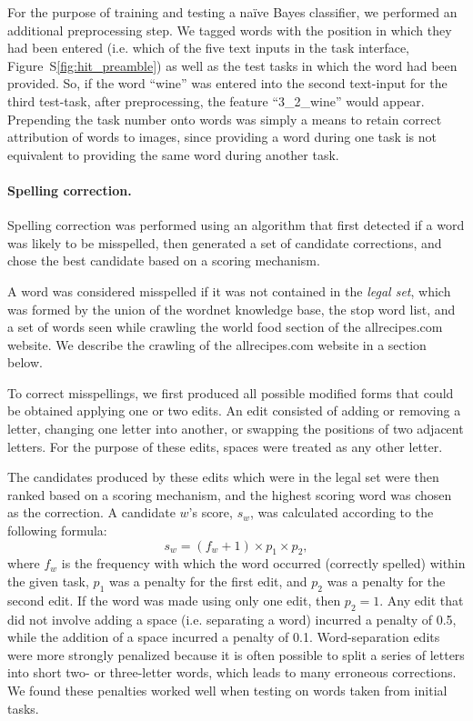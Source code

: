 \documentclass{sigchi}
\begin{document}
	For the purpose of training and testing a na\"ive Bayes classifier, we 
	performed an additional preprocessing step.  We tagged words with the
	position in which they had been entered (i.e. which of the five text 
	inputs in the task interface, Figure~S\ref{fig:hit_preamble}) 
	as well as the test tasks in which the word had been provided.
	So, if the word ``wine'' was entered into the second text-input for 
	the third test-task, after preprocessing, the feature ``3\_2\_wine'' would
	appear.  Prepending the task number onto words was simply a means to 
	retain correct attribution of words to images, since providing a word 
	during one task 
	is not equivalent to providing the same word during another task.  
	
	\paragraph{Spelling correction.}  
	Spelling correction was performed using an algorithm that first detected
	if a word was likely to be misspelled, then generated a set of candidate 
	corrections, and chose the best candidate based on a scoring mechanism.
	
	A word was considered misspelled if it was not contained in the 
	\textit{legal set}, which was formed by the union of
	the wordnet knowledge base, the stop word list, and a set of words 
	seen while 
	crawling the world food section of the allrecipes.com website.  We
	describe the crawling of the allrecipes.com website in a section below.

	To correct misspellings, we first produced all possible modified forms 
	that could be obtained applying one or two edits.  An edit consisted of 
	adding or removing a letter, changing one letter into another, or 
	swapping the positions of two adjacent letters.  For the purpose of these 
	edits, spaces were treated as any other letter.

	The candidates produced by these edits which were in the legal set were
	then ranked based on a scoring mechanism, and the highest scoring word
	was chosen as the correction.  A candidate $w$'s score, $s_w$, was 
	calculated according to the following formula:
	\begin{equation}
		s_w = (f_w + 1) \times p_1 \times p_2,
	\end{equation}
	where $f_w$ is the frequency with which the word occurred (correctly 
	spelled)
	within the given task, $p_1$ was a penalty for the first edit, and
	$p_2$ was a penalty for the second edit.  If the word was made using only
	one edit, then $p_2 = 1$.  Any edit that did not involve adding a space
	(i.e. separating a word) incurred a penalty of 0.5, while the addition of
	a space incurred a penalty of 0.1.  Word-separation edits were more 
	strongly penalized because it is often possible to split a series of 
	letters into short two- or three-letter words, which leads 
	to many erroneous corrections.  We found these penalties worked well when
	testing on words taken from initial tasks.
\end{document}
